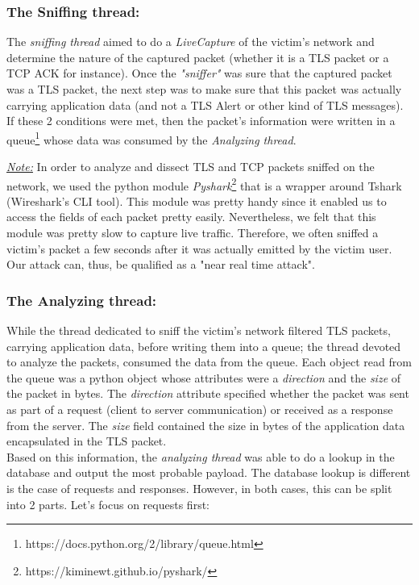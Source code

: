 \documentclass[runningheads]{llncs}
\begin{document}
\bigskip
\subsubsection*{The Sniffing thread:}
The \emph{sniffing thread} aimed to do a \emph{LiveCapture} of the victim's network and determine the nature of the captured packet (whether it is a TLS packet or a TCP ACK for instance). Once the \emph{"sniffer"} was sure that the captured packet was a TLS packet, the next step was to make sure that this packet was actually carrying application data (and not a TLS Alert or other kind of TLS messages). If these 2 conditions were met, then the packet's information were written in a queue\footnote{https://docs.python.org/2/library/queue.html} whose data was consumed by the \emph{Analyzing thread}.

\medskip

\emph{\underline{Note:}} In order to analyze and dissect TLS and TCP packets sniffed on the network, we used the python module \emph{Pyshark}\footnote{https://kiminewt.github.io/pyshark/} that is a wrapper around Tshark (Wireshark's CLI tool). This module was pretty handy since it enabled us to access the fields of each packet pretty easily. Nevertheless, we felt that this module was pretty slow to capture live traffic. Therefore, we often sniffed a victim's packet a few seconds after it was actually emitted by the victim user. Our attack can, thus, be qualified as a "near real time attack".

\bigskip
\subsubsection*{The Analyzing thread:}

While the thread dedicated to sniff the victim's network filtered TLS packets, carrying application data, before writing them into a queue; the thread devoted to analyze the packets, consumed the data from the queue. Each object read from the queue was a python object whose attributes were a \emph{direction} and the \emph{size} of the packet in bytes. The \emph{direction} attribute specified whether the packet was sent as part of a request (client to server communication) or received as a response from the server. The \emph{size} field contained the size in bytes of the application data encapsulated in the TLS packet. \\
Based on this information, the \emph{analyzing thread} was able to do a lookup in the database and output the most probable payload. The database lookup is different is the case of requests and responses. However, in both cases, this can be split into 2 parts. Let's focus on requests first:
\end{document}
